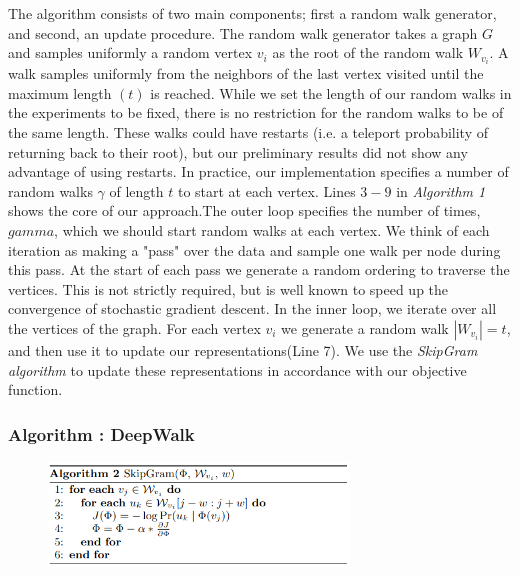 \documentclass[12pt,a4paper]{article}
\begin{document}
The algorithm consists of two main components; first a random walk generator, and second, an update procedure. The random walk generator takes a graph $G$ and samples uniformly  a  random  vertex $v_{i}$ as  the  root  of  the  random walk $W_{v_{i}}$.  A walk samples uniformly from the neighbors of the last vertex visited until the maximum length $(t)$ is reached.  While we set the length of our random walks in the experiments to be fixed, there is no restriction for the random walks to be of the same length.  These walks could have restarts (i.e. a teleport probability of returning back to their root), but our preliminary results did not show any advantage of using restarts.  In practice, our implementation specifies a number of random walks $\gamma$ of length $t$ to start at each vertex. Lines $3-9$ in \textit{Algorithm 1} shows the core of our approach.The outer loop specifies the number of times,$gamma$, which we should start random walks at each vertex.  We think of each iteration as making a "pass" over the data and sample one walk per node during this pass.  At the start of each pass we generate a random ordering to traverse the vertices.  This is not strictly required, but is well known to speed up the convergence of stochastic gradient descent. In the inner loop, we iterate over all the vertices of the graph. For  each  vertex $v_{i}$ we  generate  a  random  walk $|W_{v_{i}}|=t$,  and then use it to update our representations(Line 7).  We use the \textit{SkipGram algorithm} to update these representations in accordance with our objective function.


\subsubsection*{Algorithm : DeepWalk}

\begin{figure}[h]
\includegraphics[width=8cm]{SkipGramAlgorithm}
\centering
\end{figure}
\end{document}
